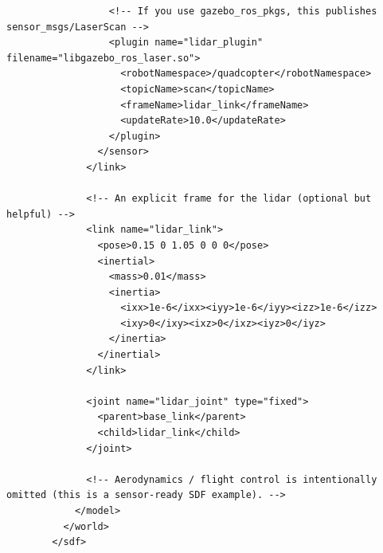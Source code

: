 \documentclass[a4paper]{article}
\begin{document}
\begin{verbatim}
                  <!-- If you use gazebo_ros_pkgs, this publishes sensor_msgs/LaserScan -->
                  <plugin name="lidar_plugin" filename="libgazebo_ros_laser.so">
                    <robotNamespace>/quadcopter</robotNamespace>
                    <topicName>scan</topicName>
                    <frameName>lidar_link</frameName>
                    <updateRate>10.0</updateRate>
                  </plugin>
                </sensor>
              </link>
        
              <!-- An explicit frame for the lidar (optional but helpful) -->
              <link name="lidar_link">
                <pose>0.15 0 1.05 0 0 0</pose>
                <inertial>
                  <mass>0.01</mass>
                  <inertia>
                    <ixx>1e-6</ixx><iyy>1e-6</iyy><izz>1e-6</izz>
                    <ixy>0</ixy><ixz>0</ixz><iyz>0</iyz>
                  </inertia>
                </inertial>
              </link>
        
              <joint name="lidar_joint" type="fixed">
                <parent>base_link</parent>
                <child>lidar_link</child>
              </joint>
        
              <!-- Aerodynamics / flight control is intentionally omitted (this is a sensor-ready SDF example). -->
            </model>
          </world>
        </sdf>
    \end{verbatim}
\end{document}
